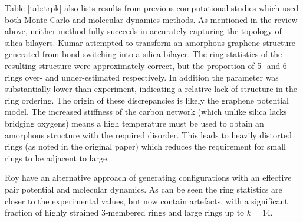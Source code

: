 Table \ref{tab:trpk} also lists results from previous computational studies which used both Monte Carlo and molecular dynamics methods. 
As mentioned in the review above, neither method fully succeeds in accurately capturing the topology of silica bilayers.
Kumar \etal{} attempted to transform an amorphous graphene structure generated from bond switching \mc{} into a silica bilayer.
The ring statistics of the resulting structure were approximately correct, but the proportion of 5\-- and 6\-- rings over\-- and under\--estimated respectively.
In addition the \aw{} parameter was substantially lower than experiment, indicating a relative lack of structure in the ring ordering.
The origin of these discrepancies is likely the graphene potential model.
The increased stiffness of the carbon network (which unlike silica lacks bridging oxygens) means a high temperature must be used to obtain an amorphous structure with the required disorder.
This leads to heavily distorted rings (as noted in the original paper) which reduces the requirement for small rings to be adjacent to large.


{Roy \etal{} have an alternative approach of generating configurations with an effective pair potential and molecular dynamics.
As can be seen the ring statistics are closer to the experimental values, but now contain artefacts, with a significant fraction of highly strained 3\--membered rings and large rings up to $k=14$.\unskip\parfillskip 0pt \par}


